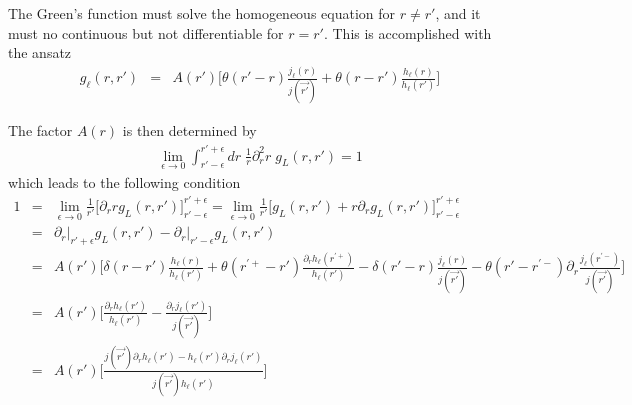 \documentclass[11pt,a4paper]{report}
\begin{document}
The Green's function must solve
the homogeneous equation for $r\neq r'$, and it must no continuous but
not differentiable for $r=r'$. This is accomplished with the ansatz
\begin{eqnarray}
g_\ell(r,r')
&=&A(r')\biggl[ \theta(r'-r) \frac{j_\ell(r)}{j(\vec{r'})}
+\theta(r-r')\frac{h_\ell(r)}{h_\ell(r')}\biggr]
\end{eqnarray}

The factor $A(r)$ is then determined by
\begin{eqnarray}
\lim_{\epsilon\rightarrow 0}
\int_{r'-\epsilon}^{r'+\epsilon} dr\; \frac{1}{r}\partial^2_r r\; g_L(r,r')=1
\end{eqnarray}
which leads to the following condition
\begin{eqnarray}
1&=&\lim_{\epsilon\rightarrow 0}\frac{1}{r'}
\biggl[\partial_r r g_L(r,r')\biggr]_{r'-\epsilon}^{r'+\epsilon} 
=
\lim_{\epsilon\rightarrow 0}\frac{1}{r'}
\biggl[
g_L(r,r')+r \partial_r g_L(r,r')\biggr]_{r'-\epsilon}^{r'+\epsilon} 
\nonumber\\
&=&\left.\partial_r\right|_{r'+\epsilon}g_L(r,r')
-\left.\partial_r\right|_{r'-\epsilon}g_L(r,r')
\nonumber\\
&=&A(r')
\biggl[ 
\delta(r-r')\frac{h_\ell(r)}{h_\ell(r')}
+\theta(r^{'+}-r')\frac{\partial_rh_\ell(r^{'+})}{h_\ell(r')}
-\delta(r'-r) \frac{j_\ell(r)}{j(\vec{r'})}
-\theta(r'-r^{'-})\partial_r\frac{j_\ell(r^{'-})}{j(\vec{r'})}
\biggr]
\nonumber\\
&=&A(r')
\biggl[ 
\frac{\partial_rh_\ell(r')}{h_\ell(r')}
-\frac{\partial_rj_\ell(r')}{j(\vec{r'})}
\biggr]
\nonumber\\
&=&A(r')
\biggl[ 
\frac{j(\vec{r'})\partial_rh_\ell(r')
-h_\ell(r')\partial_r j_\ell(r')}{j(\vec{r'})h_\ell(r')}
\biggr]
\end{eqnarray}
\end{document}
